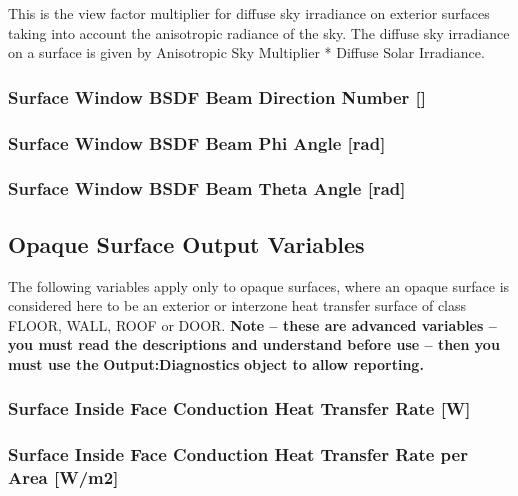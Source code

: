 This is the view factor multiplier for diffuse sky irradiance on exterior surfaces taking into account the anisotropic radiance of the sky. The diffuse sky irradiance on a surface is given by Anisotropic Sky Multiplier * Diffuse Solar Irradiance.

\subsubsection{Surface Window BSDF Beam Direction Number {[]}}\label{surface-window-bsdf-beam-direction-number}

\subsubsection{Surface Window BSDF Beam Phi Angle {[}rad{]}}\label{surface-window-bsdf-beam-phi-angle-rad}

\subsubsection{Surface Window BSDF Beam Theta Angle {[}rad{]}}\label{surface-window-bsdf-beam-theta-angle-rad}

\subsection{Opaque Surface Output Variables}\label{opaque-surface-output-variables}

The following variables apply only to opaque surfaces, where an opaque surface is considered here to be an exterior or interzone heat transfer surface of class FLOOR, WALL, ROOF or DOOR. \textbf{Note -- these are advanced variables -- you must read the descriptions and understand before use -- then you must use the} \textbf{Output:Diagnostics} \textbf{object to allow reporting.}

\subsubsection{Surface Inside Face Conduction Heat Transfer Rate {[}W{]}}\label{surface-inside-face-conduction-heat-transfer-rate-w}

\subsubsection{Surface Inside Face Conduction Heat Transfer Rate per Area {[}W/m2{]}}\label{surface-inside-face-conduction-heat-transfer-rate-per-area-wm2}

